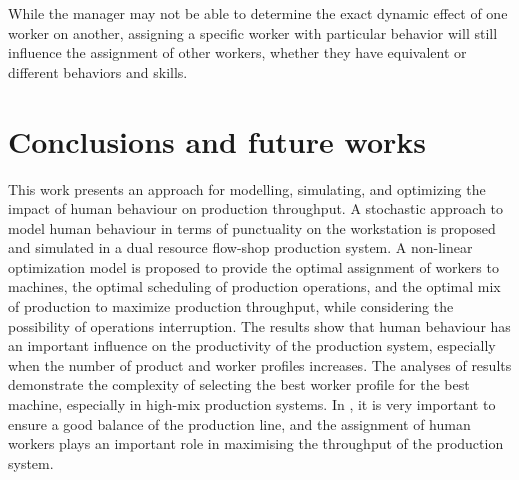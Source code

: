\documentclass[review,12pt, 3p, times]{elsarticle}
\begin{document}
While the manager may not be able to determine the exact dynamic effect of one worker on another, assigning a specific worker with particular behavior will still influence the assignment of other workers, whether they have equivalent or different behaviors and skills. 
			
					
\section{Conclusions and future works  }\label{sec:conc3}  
This work presents an approach for modelling, simulating, and optimizing the impact of human behaviour on production throughput. A stochastic approach to model human behaviour in terms of punctuality on the workstation is proposed and simulated in a dual resource flow-shop production system. A non-linear optimization model is proposed to provide the optimal assignment of workers to machines, the optimal scheduling of production operations, and the optimal mix of production to maximize production throughput, while considering the possibility of operations interruption. The results show that human behaviour has an important influence on the productivity of the production system, especially when the number of product and worker profiles increases. The analyses of results demonstrate the complexity of selecting the best worker profile for the best machine, especially in high-mix production systems. In , it is very important to ensure a good balance of the production line, and the assignment of human workers plays an important role in maximising the throughput of the production system.

	
\end{document}
